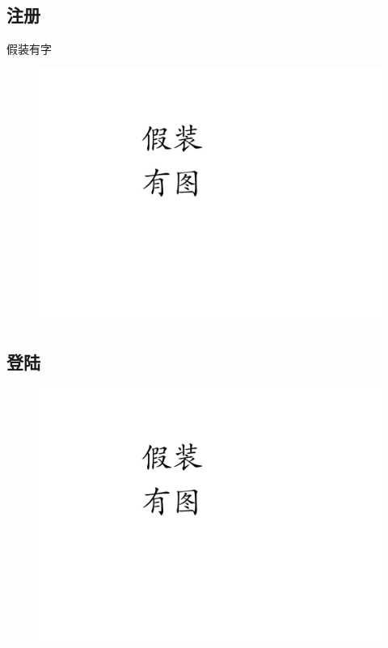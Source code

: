 \documentclass[UTF8]{ctexart}
\begin{document}
\subsection{注册}
假装有字
\begin{figure}[h]
    \centering
    \includegraphics[width=\textwidth]{manual_images//temp.png}
\end{figure}

\newpage
\subsection{登陆}
\begin{figure}[h]
    \centering
    \includegraphics[width=\textwidth]{manual_images//temp.png}
\end{figure}
\end{document}
